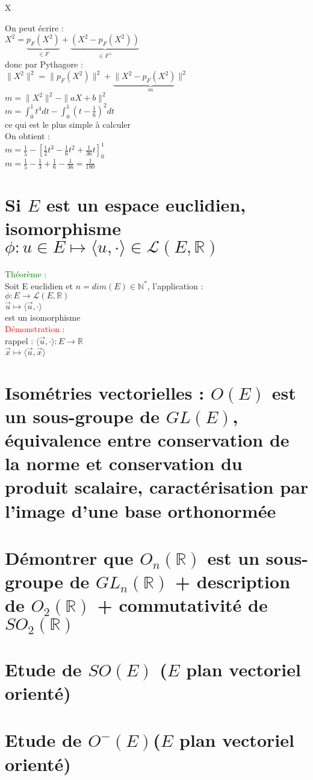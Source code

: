 X\documentclass{article}
\begin{document}
On peut écrire : \\
$X^2=\underbrace{p_F(X^2)}_{ \in F}+ \underbrace{(X^2-p_F(X^2))}_{\in F^\perp}$ \\
donc par Pythagore : \\
$\| X^2 \|^2= \| p_F(X^2) \|^2+ \underbrace{\|X^2-p_F(X^2)\|^2}_{m}$ \\
$m= \| X^2 \|^2 - \| aX+b \|^2$ \\
$m= \int_0^1 t^4 dt - \int_0^1 (t-\frac{1}{6})^2dt$ \\
ce qui est le plus simple à calculer \\
On obtient : \\
$m= \frac 1 5 - [ \frac 1 2 t^3 - \frac 1 6 t^2 + \frac 1 {36} t]_0^1$ \\
$m= \frac 15 - \frac 1 3 + \frac 1 6 - \frac 1 {36}= \frac 1 {180}$
\section{Si $E$ est un espace euclidien, isomorphisme \\ $\phi : u \in E \mapsto \langle u, \cdot \rangle \in \mathcal L(E, \mathbb R)$}
\textcolor{green}{Théorème :} \\
Soit E euclidien et $n=dim(E) \in \mathbb N^*$, l'application : \\
$\phi : E \rightarrow \mathcal L (E, \mathbb R)$ \\
$\vec u \mapsto \langle \vec u, \cdot \rangle $ \\
est un isomorphisme \\
\textcolor{red}{Démonstration :} \\
rappel : $\langle \vec u, \cdot \rangle : E \rightarrow \mathbb R$ \\
$\vec x \mapsto \langle \vec u, \vec x \rangle$
\section{Isométries vectorielles : $O(E)$ est un sous-groupe de $GL(E)$, équivalence entre conservation de la norme et conservation du produit scalaire, caractérisation par l'image d'une base orthonormée}
\section{Démontrer que $O_n(\mathbb R)$ est un sous-groupe de $GL_n(\mathbb R)$ + description de $O_2 (\mathbb R)$ + commutativité de $SO_2(\mathbb R)$}
\section{Etude de $SO(E)$ ($E$ plan vectoriel orienté)}
\section{Etude de $O^-(E)$($E$ plan vectoriel orienté)}
\end{document}
